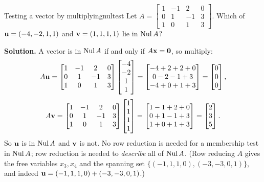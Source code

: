 \documentclass[11pt]{article}
\begin{document}
\begin{exmp}{Testing a vector by multiplying}{nultest}
Let $A=\begin{bmatrix}1&-1&2&0\\0&1&-1&3\\1&0&1&3\end{bmatrix}$. Which of $\mathbf{u}=(-4,-2,1,1)$ and $\mathbf{v}=(1,1,1,1)$ lie in $\operatorname{Nul} A$?

\textbf{Solution.} A vector is in $\operatorname{Nul} A$ if and only if $A\mathbf{x}=\mathbf{0}$, so multiply:
\[
A\mathbf{u}=\begin{bmatrix}1&-1&2&0\\0&1&-1&3\\1&0&1&3\end{bmatrix}\begin{bmatrix}-4\\-2\\1\\1\end{bmatrix}=\begin{bmatrix}-4+2+2+0\\0-2-1+3\\-4+0+1+3\end{bmatrix}=\begin{bmatrix}0\\0\\0\end{bmatrix},
\]
\[
A\mathbf{v}=\begin{bmatrix}1&-1&2&0\\0&1&-1&3\\1&0&1&3\end{bmatrix}\begin{bmatrix}1\\1\\1\\1\end{bmatrix}=\begin{bmatrix}1-1+2+0\\0+1-1+3\\1+0+1+3\end{bmatrix}=\begin{bmatrix}2\\3\\5\end{bmatrix}.
\]
So $\mathbf{u}$ is in $\operatorname{Nul} A$ and $\mathbf{v}$ is not. No row reduction is needed for a membership test in $\operatorname{Nul} A$; row reduction is needed to \emph{describe} all of $\operatorname{Nul} A$. (Row reducing $A$ gives the free variables $x_3,x_4$ and the spanning set $\{(-1,1,1,0),(-3,-3,0,1)\}$, and indeed $\mathbf{u}=(-1,1,1,0)+(-3,-3,0,1)$.)
\end{exmp}
\end{document}
